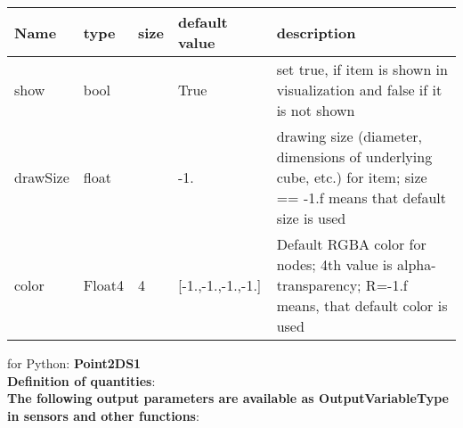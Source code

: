 \begin{center}
  \footnotesize
  \begin{longtable}{| p{4.5cm} | p{2.5cm} | p{0.5cm} | p{2.5cm} | p{6cm} |}
    \hline
    \bf Name & \bf type & \bf size & \bf default value & \bf description \\ \hline
    show &     bool &      &     True &     set true, if item is shown in visualization and false if it is not shown\\ \hline
    drawSize &     float &      &     -1. &     drawing size (diameter, dimensions of underlying cube, etc.)  for item; size == -1.f means that default size is used\\ \hline
    color &     Float4 &     4 &     [-1.,-1.,-1.,-1.] &     Default RGBA color for nodes; 4th value is alpha-transparency; R=-1.f means, that default color is used\\ \hline
	  \end{longtable}
	\end{center}

 for Python: {\bf Point2DS1}
 \vspace{6pt}\\{\bf Definition of quantities}:\\
{\bf The following output parameters are available as OutputVariableType in sensors and other functions}:\\ 
\finishTable
\newpage

